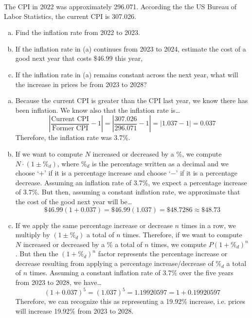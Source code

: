 \documentclass[11pt,letterpaper]{article}
\begin{document}

 The CPI in 2022 was approximately 296.071. According the the US Bureau of Labor Statistics, the current CPI is 307.026.
	\begin{enumerate}[(a)]
	\item Find the inflation rate from 2022 to 2023. 
	\item If the inflation rate in (a) continues from 2023 to 2024, estimate the cost of a good next year that costs \$46.99 this year,
	\item If the inflation rate in (a) remains constant across the next year, what will the increase in prices be from 2023 to 2028? 
	\end{enumerate} \pspace

\sol 
\begin{enumerate}[(a)]
\item Because the current CPI is greater than the CPI last year, we know there has been inflation. We know also that the inflation rate is\dots
	\[
	\left| \dfrac{\text{Current CPI}}{\text{Former CPI}} - 1 \right|= \left| \dfrac{307.026}{296.071} - 1 \right|= |1.037 - 1|= 0.037
	\]
Therefore, the inflation rate was 3.7\%. \pspace

\item If we want to compute $N$ increased or decreased by a \%, we compute $N \cdot (1 \pm \%_d)$, where $\%_d$ is the percentage written as a decimal and we choose `$+$' if it is a percentage increase and choose `$-$' if it is a percentage decrease. Assuming an inflation rate of 3.7\%, we expect a percentage increase of 3.7\%. But then, assuming a constant inflation rate, we approximate that the cost of the good next year will be\dots
	\[
	\$46.99 (1 + 0.037)= \$46.99 (1.037)= \$48.7286 \approx \$48.73
	\] \pspace

\item If we apply the same percentage increase or decrease $n$ times in a row, we multiply by $(1 \pm \%_d)$ a total of $n$ times. Therefore, if we want to compute $N$ increased or decreased by a \% a total of $n$ times, we compute $P(1 + \%_d)^n$. But then the $(1 + \%_d)^n$ factor represents the percentage increase or decrease resulting from applying a percentage increase/decrease of $\%_d$ a total of $n$ times. Assuming a constant inflation rate of 3.7\% over the five years from 2023 to 2028, we have\dots
	\[
	(1 + 0.037)^5= (1.037)^5= 1.19920597= 1 + 0.19920597
	\]
Therefore, we can recognize this as representing a 19.92\% increase, i.e. prices will increase 19.92\% from 2023 to 2028. 
\end{enumerate}
\end{document}
